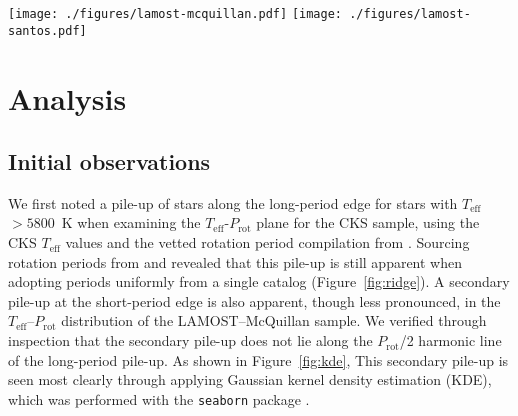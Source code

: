 \documentclass[trackchanges,twocolumn]{aastex631}
\newcommand{\lamostmcq}{LAMOST--McQuillan\xspace}
\newcommand{\lamostsan}{LAMOST--Santos\xspace}
\newcommand{\teff}{\ensuremath{T_{\mathrm{eff}}}\xspace}
\newcommand{\logg}{\ensuremath{\log g}\xspace}
\newcommand{\prot}{\ensuremath{P_\mathrm{rot}}\xspace}
\begin{document}
\begin{figure*}
    \centering
    \texttt{[image: ./figures/lamost-mcquillan.pdf]}
    \texttt{[image: ./figures/lamost-santos.pdf]}
    \caption{Two-dimensional histograms indicating the number of Kepler target stars in the \teff–\prot plane for the \lamostmcq sample (top row) and the \lamostsan sample (bottom row). The effects of a simple cut in \logg to separate subgiants and dwarfs are shown in the middle and right columns. In each panel the Sun is indicated by the orange point, with an errorbar reflecting the range of periods measured from its differentially rotating surface. The long-period pile-up for dwarf stars is clearly seen to extend to the solar temperature. The short-period pile-up is clearer in the smaller \lamostmcq dwarf sample, potentially because the \citet{Santos2021} catalog detected more stars at longer periods. The secondary overdensity observed in the subgiant samples, most visible in the bottom center panel, appears to be at twice the period of the primary overdensity, potentially due to erroneously determined rotation periods.}
    \label{fig:xmatch}
\end{figure*}


\section{Analysis}
\label{sec:analysis}

\subsection{Initial observations}
We first noted a pile-up of stars along the long-period edge for stars with \teff~$>5800$~K when examining the \teff-\prot plane for the CKS sample, using the CKS \teff values and the vetted rotation period compilation from \citet{David2021}. Sourcing rotation periods from \citet{McQuillan2013, Mazeh2015} and \citet{Angus2018} revealed that this pile-up is still apparent when adopting periods uniformly from a single catalog (Figure~\ref{fig:ridge}). A secondary pile-up at the short-period edge is also apparent, though less pronounced, in the \teff--\prot distribution of the \lamostmcq sample. We verified through inspection that the secondary pile-up does not lie along the \prot/2 harmonic line of the long-period pile-up. As shown in Figure~\ref{fig:kde}, This secondary pile-up is seen most clearly through applying Gaussian kernel density estimation (KDE), which was performed with the \texttt{seaborn} package \citep{seaborn}. 
\end{document}

